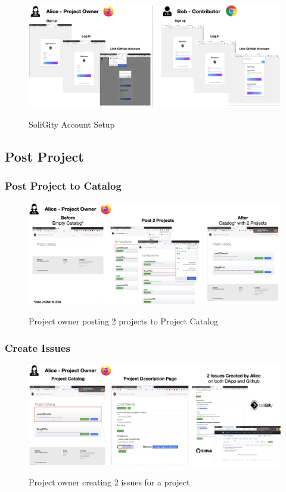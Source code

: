 \documentclass[12pt]{article}
\renewcommand{\_}{\kern-1.5pt\textunderscore\kern-1.5pt}
\begin{document}
\begin{figure}[H]
	\centering
	\includegraphics[width=16.5cm]{graphs/49. setup_4.png}\\
	\caption{SoliGity Account Setup}
	\label{fig:setup6}
\end{figure}

\subsection{Post Project}
\subsubsection{Post Project to Catalog}
\begin{figure}[H]
	\centering
	\includegraphics[width=16.5cm]{graphs/50. post_1.png}\\
	\caption{Project owner posting 2 projects to Project Catalog}
	\label{fig:post1}
\end{figure}

\subsubsection{Create Issues}

\begin{figure}[H]
	\centering
	\includegraphics[width=16.5cm]{graphs/51. post_2.png}\\
	\caption{Project owner creating 2 issues for a project}
	\label{fig:post2}
\end{figure}
\end{document}

